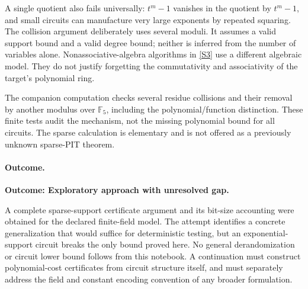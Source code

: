 \documentclass[11pt,a4paper]{article}
\numberwithin{equation}{section}
\newcommand{\F}{\mathbb{F}}
\newcommand{\sref}[2]{\hyperlink{source:#1:#2}{[S#2]}}
\begin{document}
A single quotient also fails universally: $t^m-1$ vanishes in the quotient
by $t^m-1$, and small circuits can manufacture very large exponents by
repeated squaring. The collision argument deliberately uses several
moduli. It assumes a valid support bound and a valid degree bound; neither
is inferred from the number of variables alone. Nonassociative-algebra
algorithms in \sref{70}{3} use a different algebraic model. They do not
justify forgetting the commutativity and associativity of the target's
polynomial ring.

The companion computation checks several residue collisions and their
removal by another modulus over $\F_5$, including the polynomial/function
distinction. These finite tests audit the mechanism, not the missing
polynomial bound for all circuits. The sparse calculation is elementary
and is not offered as a previously unknown sparse-PIT theorem.

\paragraph{Outcome.}
\textbf{Outcome: Exploratory approach with unresolved gap.}

A complete sparse-support certificate argument and its bit-size accounting
were obtained for the declared finite-field model. The attempt identifies
a concrete generalization that would suffice for deterministic testing,
but an exponential-support circuit breaks the only bound proved here.
No general derandomization or circuit lower bound follows from this notebook.
A continuation must construct polynomial-cost certificates from circuit
structure itself, and must separately address the field and constant
encoding convention of any broader formulation.

\needspace{170mm}
\end{document}
